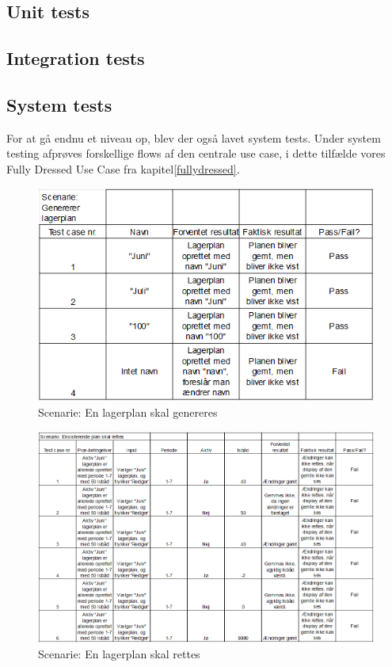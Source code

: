 \subsection{Unit tests}


\subsection{Integration tests}


\subsection{System tests}
For at gå endnu et niveau op, blev der også lavet system tests\cite{TestLevels}. Under system testing afprøves forskellige flows af den centrale use case, i dette tilfælde vores Fully Dressed Use Case fra kapitel\ref{fullydressed}.




\begin{figure}[p]
    \centering
    \includegraphics[width=0.8\hsize]{figures/tests/test_generer_plan.png}
    \caption{Scenarie: En lagerplan skal genereres}
    \label{fig:testdelete}
\end{figure}


\begin{figure}[p]
    \centering
    \includegraphics[width=0.8\hsize]{figures/tests/delete_existing_plan.png}
    \caption{Scenarie: En lagerplan skal rettes}
    \label{fig:testdelete}
\end{figure}



